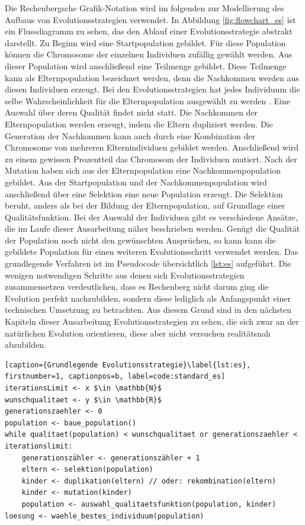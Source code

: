 Die Rechenbergsche Grafik-Notation wird im folgenden zur Modellierung des Aufbaus von Evolutionsstrategien verwendet. In Abbildung \ref{fig:flowchart_es} ist ein Flussdiagramm zu sehen, das den Ablauf einer Evolutionsstrategie abstrakt darstellt.
Zu Beginn wird eine Startpopulation gebildet. Für diese Population können die Chromosome der einzelnen Individuen zufällig gewählt werden. Aus dieser Population wird anschließend eine Teilmenge gebildet. Diese Teilmenge kann als Elternpopulation bezeichnet werden, denn die Nachkommen werden aus diesen Individuen erzeugt. Bei den Evolutionsstrategien hat jedes Individuum die selbe Wahrscheinlichkeit für die Elternpopulation ausgewählt zu werden \cite[S.220]{schoeneburg}. Eine Auswahl über deren Qualität findet nicht statt. Die Nachkommen der Elternpopulation werden erzeugt, indem die Eltern dupliziert werden. Die Generation der Nachkommen kann auch durch eine Kombination der Chromosome von mehreren Elternindividuen gebildet werden. Anschließend wird zu einem gewissen Prozentteil das Chromosom der Individuen mutiert. 
Nach der Mutation haben sich aus der Elternpopulation eine Nachkommenpopulation gebildet. Aus der Startpopulation und der Nachkommenpopulation wird anschließend über eine Selektion eine neue Population erzeugt. Die Selektion beruht, anders als bei der Bildung der Elternpopulation, auf Grundlage einer Qualitätsfunktion.
Bei der Auswahl der Individuen gibt es verschiedene Ansätze, die im Laufe dieser Ausarbeitung näher beschrieben werden. Genügt die Qualität der Population noch nicht den gewünschten Ansprüchen, so kann kann die gebildete Population für einen weiteren Evolutionsschritt verwendet werden.
Das grundlegende Verfahren ist im Pseudocode übersichtlich \ref{lst:es} aufgeführt. Die wenigen notwendigen Schritte aus denen sich Evolutionsstrategien zusammensetzen verdeutlichen, dass es Rechenberg nicht darum ging die Evolution perfekt nachzubilden, sondern diese lediglich als Anfangspunkt einer technischen Umsetzung zu betrachten. Aus diesem Grund sind in den nächsten Kapiteln dieser Ausarbeitung Evolutionsstrategien zu sehen, die sich zwar an der natürlichen Evolution orientieren, diese aber nicht versuchen realitätsnah abzubilden.
\begin{lstlisting}[caption={Grundlegende Evolutionsstrategie}\label{lst:es}, firstnumber=1, captionpos=b, label=code:standard_es]
iterationsLimit <- x $\in \mathbb{N}$
wunschqualitaet <- y $\in \mathbb{R}$
generationszaehler <- 0
population <- baue_population()
while qualitaet(population) < wunschqualitaet or generationszaehler < iterationslimit:
	generationszähler <- generationszähler + 1
	eltern <- selektion(population)
	kinder <- duplikation(eltern) // oder: rekombination(eltern)
	kinder <- mutation(kinder)
	population <- auswahl_qualitaetsfunktion(population, kinder)
loesung <- waehle_bestes_individuum(population)
\end{lstlisting}

